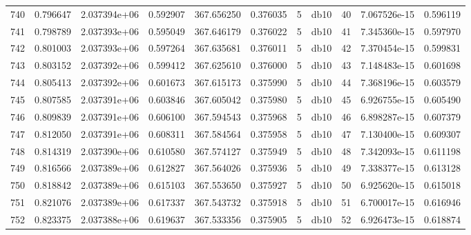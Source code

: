 \begin{tabular}{lrrrrrrlrrr}
740  &    0.796647 &        2.037394e+06 &  0.592907 &              367.656250 &    0.376035 &       5 &         db10 &     40 &   7.067526e-15 &      0.596119 \\
741  &    0.798789 &        2.037393e+06 &  0.595049 &              367.646179 &    0.376022 &       5 &         db10 &     41 &   7.345360e-15 &      0.597970 \\
742  &    0.801003 &        2.037393e+06 &  0.597264 &              367.635681 &    0.376011 &       5 &         db10 &     42 &   7.370454e-15 &      0.599831 \\
743  &    0.803152 &        2.037392e+06 &  0.599412 &              367.625610 &    0.376000 &       5 &         db10 &     43 &   7.148483e-15 &      0.601698 \\
744  &    0.805413 &        2.037392e+06 &  0.601673 &              367.615173 &    0.375990 &       5 &         db10 &     44 &   7.368196e-15 &      0.603579 \\
745  &    0.807585 &        2.037391e+06 &  0.603846 &              367.605042 &    0.375980 &       5 &         db10 &     45 &   6.926755e-15 &      0.605490 \\
746  &    0.809839 &        2.037391e+06 &  0.606100 &              367.594543 &    0.375968 &       5 &         db10 &     46 &   6.898287e-15 &      0.607379 \\
747  &    0.812050 &        2.037391e+06 &  0.608311 &              367.584564 &    0.375958 &       5 &         db10 &     47 &   7.130400e-15 &      0.609307 \\
748  &    0.814319 &        2.037390e+06 &  0.610580 &              367.574127 &    0.375949 &       5 &         db10 &     48 &   7.342093e-15 &      0.611198 \\
749  &    0.816566 &        2.037389e+06 &  0.612827 &              367.564026 &    0.375936 &       5 &         db10 &     49 &   7.338377e-15 &      0.613128 \\
750  &    0.818842 &        2.037389e+06 &  0.615103 &              367.553650 &    0.375927 &       5 &         db10 &     50 &   6.925620e-15 &      0.615018 \\
751  &    0.821076 &        2.037389e+06 &  0.617337 &              367.543732 &    0.375918 &       5 &         db10 &     51 &   6.700017e-15 &      0.616946 \\
752  &    0.823375 &        2.037388e+06 &  0.619637 &              367.533356 &    0.375905 &       5 &         db10 &     52 &   6.926473e-15 &      0.618874 \\

\end{tabular}
